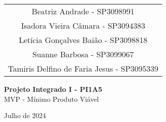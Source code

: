 \documentclass[
    12pt,               %
    openright,          %
    oneside,
    a4paper,            %
    hyphens,
    paginasA3,  %
    GLOSSARIO, %
    TODO, %
    english,            %
    brazil           %
    ]{regras-pi1a5} %
\begin{document}
\begin{titlepage}
    \begin{center}
        \vspace*{1cm}
        
        \begin{tabular}{c}
            {\large Beatriz Andrade - SP3098991} \\
            {\large Isadora Vieira Câmara - SP3094383} \\
            {\large Letícia Gonçalves Baião - SP3098818} \\
            {\large Suanne Barbosa - SP3099067} \\
            {\large Tamiris Delfino de Faria Jesus - SP3095339} \\
        \end{tabular}
        
        \vspace{6cm}
        
        \textbf{\LARGE{Projeto Integrado I - PI1A5}}\\
        \vspace{0.2cm}
        {\large{MVP - Mínimo Produto Viável}}
    
        \vfill
        
        \large{Julho de 2024}
        
    \end{center}
\end{titlepage}





\renewcommand{\vhhistoryname}{Histórico de Revisões}
\renewcommand{\vhversionname}{Revisão}
\renewcommand{\vhdatename}{Data}
\renewcommand{\vhauthorname}{Autores}
\renewcommand{\vhchangename}{Descrição}

\begin{versionhistory}



\end{versionhistory}


\end{document}
